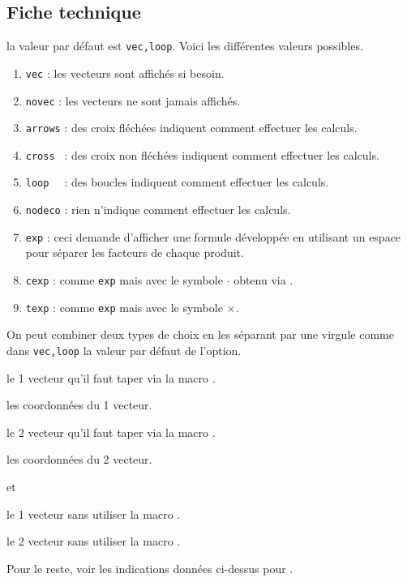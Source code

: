 \documentclass[12pt,a4paper]{article}
\begin{document}


\subsection{Fiche technique}

 \hfill {}


\IDoption{} la valeur par défaut est \verb+vec,loop+. Voici les différentes valeurs possibles.
\begin{enumerate}
    \item \verb+vec+ : les vecteurs sont affichés si besoin.

    \item \verb+novec+ : les vecteurs ne sont jamais affichés.

    \medskip
    
    \item \verb+arrows+ : des croix fléchées indiquent comment effectuer les calculs.

    \item \verb+cross + : des croix non fléchées indiquent comment effectuer les calculs.

    \item \verb+loop  + : des boucles indiquent comment effectuer les calculs.

    \item \verb+nodeco+ : rien n'indique comment effectuer les calculs.

    \medskip

    \item \verb+exp+ : ceci demande d'afficher une formule développée en utilisant un espace pour séparer les facteurs de chaque produit.

    \item \verb+cexp+ : comme \verb+exp+ mais avec le symbole $\cdot$ obtenu via .

    \item \verb+texp+ : comme \verb+exp+ mais avec le symbole $\times$.
\end{enumerate}

            On peut combiner deux types de choix en les séparant par une virgule comme dans \verb+vec,loop+ la valeur par défaut de l'option.


 le 1\ier{} vecteur qu'il faut taper via la macro .

 les coordonnées du 1\ier{} vecteur.

 le 2\ieme{} vecteur qu'il faut taper via la macro .

 les coordonnées du 2\ieme{} vecteur.


\separation


 \hfill {}
                                  et 

 le 1\ier{} vecteur sans utiliser la macro .

 le 2\ieme{} vecteur sans utiliser la macro .

\medskip

Pour le reste, voir les indications données ci-dessus pour .
%
\end{document}
